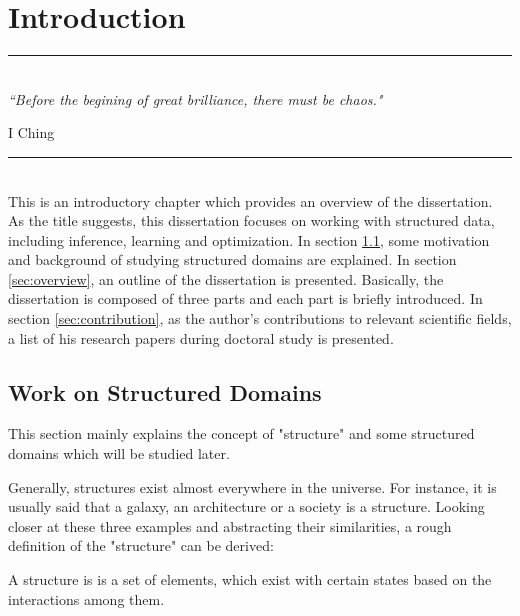 
\chapter{Introduction} %
\label{Chapter1} %

\rule{\textwidth}{0.4pt} \\[0.5cm]
\textit{``Before the begining of great brilliance, there must be chaos."}

\begin{flushright}
I Ching
\end{flushright}
\rule{\textwidth}{0.4pt} 
\\
This is an introductory chapter which provides an overview of the dissertation. As the title suggests, this dissertation focuses on working with structured data, including 
inference, learning and optimization. In section \ref{sec:motivation}, some motivation and background of studying structured domains are explained. In section \ref{sec:overview}, 
an outline of the dissertation is presented. Basically, the dissertation is composed of three parts and each part is briefly introduced. In section \ref{sec:contribution}, as the author's 
contributions to relevant scientific fields, a list of his research papers during doctoral study is presented.        


\section{Work on Structured Domains}
\label{sec:motivation}
This section mainly explains the concept of "structure" and some structured domains which will be studied later.                  

Generally, structures exist almost everywhere in the universe. For instance, it is usually said that a galaxy, an architecture or a society is a structure.          
Looking closer at these three examples and abstracting their similarities, a rough definition of the "structure" can be derived:     
\begin{definition}
A structure is is a set of elements, which exist with certain states based on the interactions among them. 
\end{definition}

